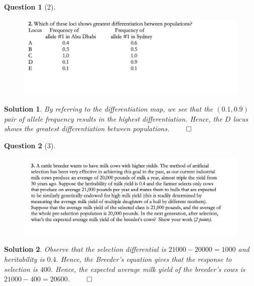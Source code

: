 \documentclass{article} %
\theoremstyle{quest}
\newtheorem*{question}{Question}
\newtheorem*{solution}{Solution}
\begin{document}
\newpage

\begin{question}[2]
\hfill
\begin{figure}[h!]
  \centering
    \includegraphics[width=1\textwidth]{genetics-9-2.png}
\end{figure}
\end{question}
\begin{solution}
By referring to the differentiation map, we see that the $(0.1,0.9)$ 
pair of allele frequency results in the highest differentiation. Hence,
the $D$ locus shows the greatest differentiation between populations.
\hfill $\qed$ 
\end{solution}

\newpage

\begin{question}[3]
\hfill
\begin{figure}[h!]
  \centering
    \includegraphics[width=1\textwidth]{genetics-9-3.png}
\end{figure}
\end{question}
\begin{solution}
Observe that the selection differential is $21000 - 20000 = 1000$ and
heritability is $0.4$. Hence, the Breeder's equation gives that
the response to selection is $400$. Hence, the expected
average milk yield of the breeder's cows is $21000 - 400 = 20600$. 
\hfill $\qed$
\end{solution}

\newpage 
\end{document}
